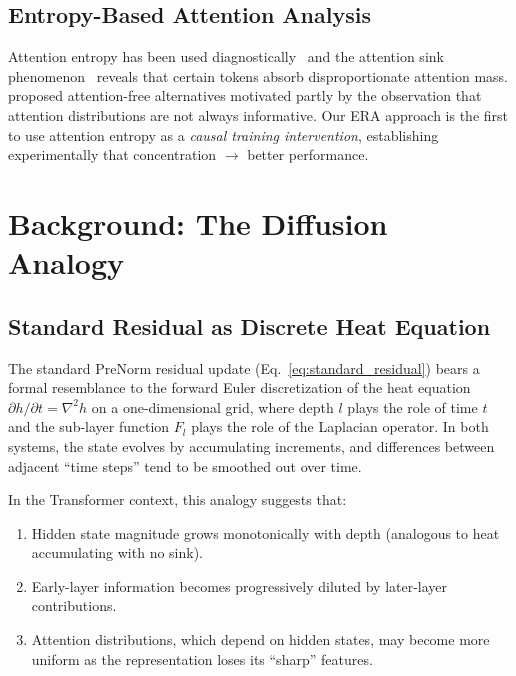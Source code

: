 \documentclass[10pt]{article}
\begin{document}
\subsection{Entropy-Based Attention Analysis}

Attention entropy has been used diagnostically~\cite{vig2020,clark2019} and the attention sink phenomenon~\cite{xiao2023streaming} reveals that certain tokens absorb disproportionate attention mass. \cite{zhai2021aft} proposed attention-free alternatives motivated partly by the observation that attention distributions are not always informative. Our ERA approach is the first to use attention entropy as a \emph{causal training intervention}, establishing experimentally that concentration $\rightarrow$ better performance.

\section{Background: The Diffusion Analogy}

\subsection{Standard Residual as Discrete Heat Equation}

The standard PreNorm residual update (Eq.~\ref{eq:standard_residual}) bears a formal resemblance to the forward Euler discretization of the heat equation $\partial h / \partial t = \nabla^2 h$ on a one-dimensional grid, where depth $l$ plays the role of time $t$ and the sub-layer function $F_l$ plays the role of the Laplacian operator. In both systems, the state evolves by accumulating increments, and differences between adjacent ``time steps'' tend to be smoothed out over time.

In the Transformer context, this analogy suggests that:
\begin{enumerate}[leftmargin=*,itemsep=2pt]
    \item Hidden state magnitude grows monotonically with depth (analogous to heat accumulating with no sink).
    \item Early-layer information becomes progressively diluted by later-layer contributions.
    \item Attention distributions, which depend on hidden states, may become more uniform as the representation loses its ``sharp'' features.
\end{enumerate}
\end{document}
